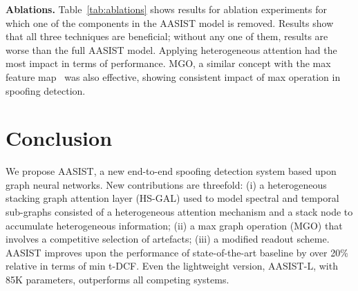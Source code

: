 \documentclass{article}
\newcommand{\newpara}[1]{\vspace{8pt}\noindent\textbf{#1}}
\begin{document}
\newpara{Ablations.}
Table~\ref{tab:ablations} shows results for ablation experiments for which one of the components in the AASIST model is removed. 
Results show that all three techniques are beneficial; without any one of them, results are worse than the full AASIST model.
Applying heterogeneous attention had the most impact in terms of performance. 
MGO, a similar concept with the max feature map~\cite{wu2018light} was also effective, showing consistent impact of max operation in spoofing detection.

\section{Conclusion}
\label{sec:conclusion}
We propose AASIST, a new end-to-end spoofing detection system based upon graph neural networks. 
New contributions are threefold: (i) a heterogeneous stacking graph attention layer (HS-GAL) used to model spectral and temporal sub-graphs consisted of a heterogeneous attention mechanism and a stack node to accumulate heterogeneous information; (ii) a max graph operation (MGO) that involves a competitive selection of artefacts; (iii) a modified readout scheme. 
AASIST improves upon the performance of state-of-the-art baseline by over 20\% relative in terms of min t-DCF. 
Even the lightweight version, AASIST-L, with 85K parameters, outperforms all competing systems. 

\clearpage


\end{document}
